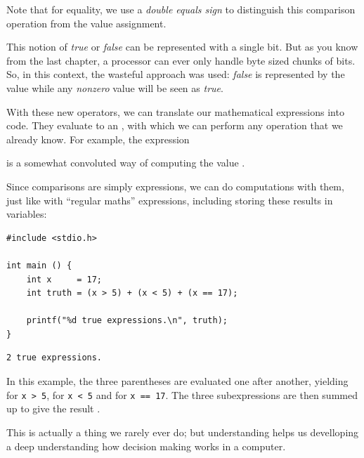 Note that for equality, we use a \emph{double equals sign} to distinguish this comparison operation from the value assignment.

This notion of \emph{true} or \emph{false} can be represented with a single bit. But as you know from the last chapter, a processor can ever only handle byte sized chunks of bits. So, in this context, the wasteful approach was used: \emph{false} is represented by the value  while any \emph{nonzero} value will be seen as \emph{true}.

With these new operators, we can translate our mathematical expressions into code. They evaluate to an , with which we can perform any operation that we already know. For example, the expression
\begin{center}
\end{center}
is a somewhat convoluted way of computing the value .

Since comparisons are simply  expressions, we can do computations with them, just like with \enquote{regular maths} expressions, including storing these results in  variables:
\begin{codebox}[truthValues.c]
\begin{verbatim}
#include <stdio.h>

int main () {
    int x     = 17;
    int truth = (x > 5) + (x < 5) + (x == 17);

    printf("%d true expressions.\n", truth);
}
\end{verbatim}
\end{codebox}

\begin{cmdbox}
\begin{verbatim}
2 true expressions.
\end{verbatim}
\end{cmdbox}

In this example, the three parentheses are evaluated one after another, yielding  for \texttt{x > 5},  for \texttt{x < 5} and  for \texttt{x == 17}. The three subexpressions are then summed up to give the result .

This is actually a thing we rarely ever do; but understanding helps us develloping a deep understanding how decision making works in a computer.

